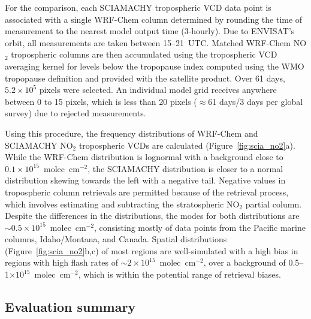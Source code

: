 For the comparison, each SCIAMACHY tropospheric VCD data point is associated with
a single WRF-Chem column determined by rounding the time of measurement to the
nearest model output time (3-hourly). Due to ENVISAT's orbit, all measurements are
taken between 15--21~UTC. Matched WRF-Chem NO$_2$ tropospheric columns are then
accumulated using the tropospheric VCD averaging kernel for levels below the
tropopause index computed using the WMO tropopause definition and provided with the satellite product. Over 61 days,
$5.2\times10^5$ pixels were selected. An individual model grid receives anywhere between 0
to 15 pixels, which is less than 20 pixels ($\approx$61 days/3 days per global survey) due
to rejected measurements.

Using this procedure, the frequency distributions of WRF-Chem and SCIAMACHY
NO$_2$ tropospheric VCDs are calculated (Figure~\ref{fig:scia_no2}a). While the
WRF-Chem distribution is lognormal with a background close to
$0.1\times10^{15}$~molec~cm$^{-2}$, the SCIAMACHY distribution is closer to a
normal distribution skewing towards the left with a negative tail. Negative values
in tropospheric column retrievals are permitted because of the retrieval process,
which involves estimating and subtracting the stratospheric NO$_2$ partial column.
Despite the differences in the distributions, the modes for both distributions are
$\sim0.5\times10^{15}$~molec~cm$^{-2}$, consisting mostly of data points from
the Pacific marine columns, Idaho/Montana, and Canada. Spatial distributions (Figure~\ref{fig:scia_no2}b,c) of
most regions are well-simulated with a high bias in regions with high flash
rates of $\sim2\times10^{15}$~molec~cm$^{-2}$, over a background of 0.5--1$\times 10^{15}$~molec~cm$^{-2}$,
which is within the potential range of retrieval biases.

\subsection{Evaluation summary}\label{sect:val/summary}

